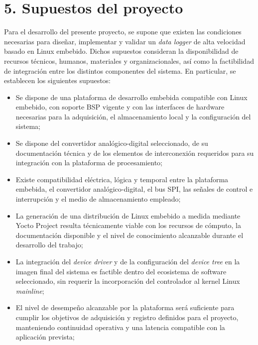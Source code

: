 \documentclass[
11pt, %
]{charter}
\begin{document}
\section{5. Supuestos del proyecto}
\label{sec:supuestos}

Para el desarrollo del presente proyecto, se supone que existen las condiciones necesarias para diseñar, implementar y validar un \textit{data logger} de alta velocidad basado en Linux embebido. Dichos supuestos consideran la disponibilidad de recursos técnicos, humanos, materiales y organizacionales, así como la factibilidad de integración entre los distintos componentes del sistema. En particular, se establecen los siguientes supuestos:
\begin{itemize}
    \item Se dispone de una plataforma de desarrollo embebida compatible con Linux embebido, con soporte BSP vigente y con las interfaces de hardware necesarias para la adquisición, el almacenamiento local y la configuración del sistema;
    
    \item Se dispone del convertidor analógico-digital seleccionado, de su documentación técnica y de los elementos de interconexión requeridos para su integración con la plataforma de procesamiento;
    
    \item Existe compatibilidad eléctrica, lógica y temporal entre la plataforma embebida, el convertidor analógico-digital, el bus SPI, las señales de control e interrupción y el medio de almacenamiento empleado;
    
    \item La generación de una distribución de Linux embebido a medida mediante Yocto Project resulta técnicamente viable con los recursos de cómputo, la documentación disponible y el nivel de conocimiento alcanzable durante el desarrollo del trabajo;
    
    \item La integración del \textit{device driver} y de la configuración del \textit{device tree} en la imagen final del sistema es factible dentro del ecosistema de software seleccionado, sin requerir la incorporación del controlador al kernel Linux \textit{mainline};
    
    \item El nivel de desempeño alcanzable por la plataforma será suficiente para cumplir los objetivos de adquisición y registro definidos para el proyecto, manteniendo continuidad operativa y una latencia compatible con la aplicación prevista;
    

\end{itemize}
\end{document}
